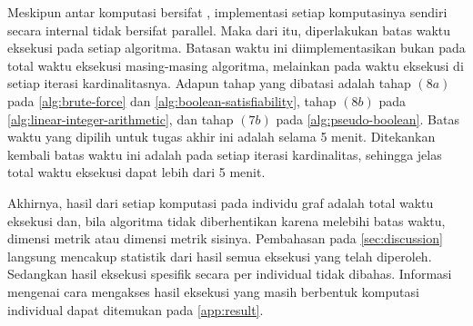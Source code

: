 \vspace{-0.1em}

Meskipun antar komputasi bersifat , implementasi setiap komputasinya sendiri secara internal tidak bersifat parallel. Maka dari itu, diperlakukan batas waktu eksekusi pada setiap algoritma. Batasan waktu ini diimplementasikan bukan pada total waktu eksekusi masing-masing algoritma, melainkan pada waktu eksekusi di setiap iterasi kardinalitasnya. Adapun tahap yang dibatasi adalah tahap \((8a)\) pada \autoref{alg:brute-force} dan \autoref{alg:boolean-satisfiability}, tahap \((8b)\) pada \autoref{alg:linear-integer-arithmetic}, dan tahap \((7b)\) pada \autoref{alg:pseudo-boolean}. Batas waktu yang dipilih untuk tugas akhir ini adalah selama 5 menit. Ditekankan kembali batas waktu ini adalah pada setiap iterasi kardinalitas, sehingga jelas total waktu eksekusi dapat lebih dari 5 menit.

Akhirnya, hasil dari setiap komputasi pada individu graf adalah total waktu eksekusi dan, bila algoritma tidak diberhentikan karena melebihi batas waktu, dimensi metrik atau dimensi metrik sisinya. Pembahasan pada \autoref{sec:discussion} langsung mencakup statistik dari hasil semua eksekusi yang telah diperoleh. Sedangkan hasil eksekusi spesifik secara per individual tidak dibahas. Informasi mengenai cara mengakses hasil eksekusi yang masih berbentuk komputasi individual dapat ditemukan pada \cref{app:result}.
